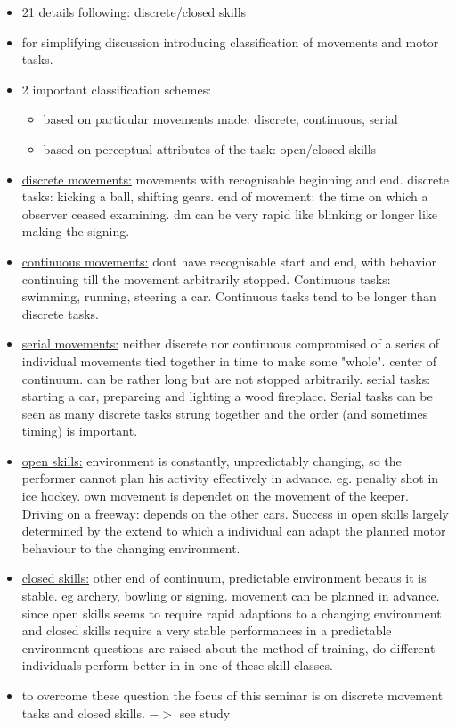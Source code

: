 \begin{itemize}
	\item 21 details following: discrete/closed skills
	\item for simplifying discussion introducing classification of movements and motor tasks.
	\item 2 important classification schemes:
	\begin{itemize}
		\item based on particular movements made: discrete, continuous, serial
		\item based on perceptual attributes of the task: open/closed skills
	\end{itemize}
	\item \underline{discrete movements:} movements with recognisable beginning and end. discrete tasks: kicking a ball, shifting gears. end of movement: the time on which a observer ceased examining. dm can be very rapid like blinking or longer like making the signing.
	\item \underline{continuous movements:} dont have recognisable start and end, with behavior continuing till the movement arbitrarily stopped. Continuous tasks: swimming, running, steering a car. Continuous tasks tend to be longer than discrete tasks.
	\item \underline{serial movements:} neither discrete nor continuous compromised of a series of individual movements tied together in time to make some "whole". center of continuum. can be rather long but are not stopped arbitrarily. serial tasks: starting a car, prepareing and lighting a wood fireplace. Serial tasks can be seen as many discrete tasks strung together and the order (and sometimes timing) is important.
	\item \underline{open skills:} environment is constantly, unpredictably changing, so the performer cannot plan his activity effectively in advance. eg. penalty shot in ice hockey. own movement is dependet on the movement of the keeper. Driving on a freeway: depends on the other cars. Success in open skills largely determined by the extend to which a individual can adapt the planned motor behaviour to the changing environment.
	\item \underline{closed skills:} other end of continuum, predictable environment becaus it is stable. eg archery, bowling or signing. movement can be planned in advance.
	since open skills  seems to require rapid adaptions to a changing environment and closed skills require a very stable performances in a predictable environment questions are raised about the method of training, do different individuals perform better in in one of these skill classes. 
	\item to overcome these question the focus of this seminar is on discrete movement tasks and closed skills. $->$ see study
\end{itemize}


